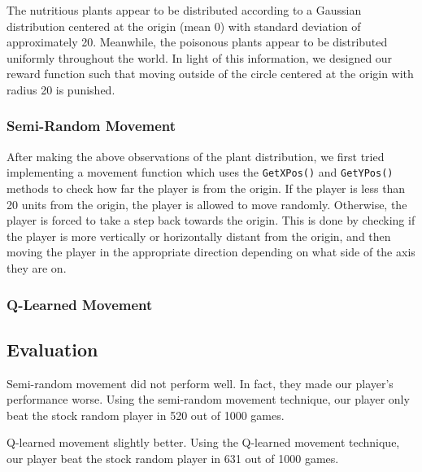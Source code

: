 \documentclass[solution, letterpaper]{cs121}
\begin{document}
The nutritious plants appear to be distributed according to a Gaussian distribution centered at the origin (mean 0) with standard deviation of approximately 20. Meanwhile, the poisonous plants appear to be distributed uniformly throughout the world. In light of this information, we designed our reward function such that moving outside of the circle centered at the origin with radius 20 is punished.

\subsubsection{Semi-Random Movement}
After making the above observations of the plant distribution, we first tried implementing a movement function which uses the {\tt GetXPos()} and {\tt GetYPos()} methods to check how far the player is from the origin. If the player is less than 20 units from the origin, the player is allowed to move randomly. Otherwise, the player is forced to take a step back towards the origin. This is done by checking if the player is more vertically or horizontally distant from the origin, and then moving the player in the appropriate direction depending on what side of the axis they are on.

\subsubsection{Q-Learned Movement}

\subsection{Evaluation}
Semi-random movement did not perform well. In fact, they made our player's performance worse. Using the semi-random movement technique, our player only beat the stock random player in 520 out of 1000 games.

Q-learned movement slightly better. Using the Q-learned movement technique, our player beat the stock random player in 631 out of 1000 games.
\end{document}
